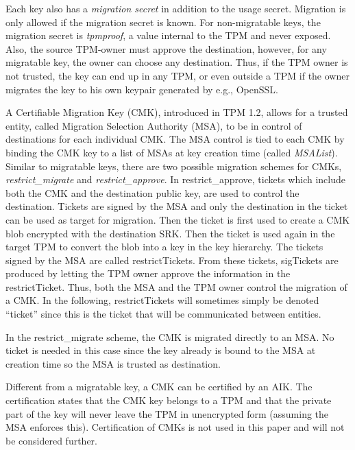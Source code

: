 {Each key also has a \textit{migration secret} in addition to the usage secret. Migration is only allowed if the migration secret is known. For non-migratable keys, the migration secret is \textit{tpmproof}, a value internal to the TPM and never exposed. Also, the source TPM-owner must approve the destination, however, for any migratable key, the owner can choose any destination. Thus, if the TPM owner is not trusted, the key can end up in any TPM, or even outside a TPM if the owner migrates the key to his own keypair generated by e.g., OpenSSL.

A Certifiable Migration Key (CMK), introduced in TPM 1.2, allows for a trusted entity, called Migration Selection Authority (MSA), to be in control of destinations for each individual CMK. The MSA control is tied to each CMK by binding the CMK key to a list of MSAs at key creation time (called \textit{MSAList}). Similar to migratable keys, there are two possible migration schemes for CMKs, \textit{restrict\_migrate} and \textit{restrict\_approve}. In restrict\_approve, tickets which include both the CMK and the destination public key, are used to control the destination. Tickets are signed by the MSA and only the destination in the ticket can be used as target for migration. Then the ticket is first used to create a CMK blob encrypted with the destination SRK. Then the ticket is used again in the target TPM to convert the blob into a key in the key hierarchy. The tickets signed by the MSA are called restrictTickets. From these tickets, sigTickets are produced by letting the TPM owner approve the information in the restrictTicket. Thus, both the MSA and the TPM owner control the migration of a CMK. In the following, restrictTickets will sometimes simply be denoted ``ticket'' since this is the ticket that will be communicated between entities.

In the restrict\_migrate scheme, the CMK is migrated directly to an MSA. No ticket is needed in this case since the key already is bound to the MSA at creation time so the MSA is trusted as destination.
 
Different from a migratable key, a CMK can be certified by an AIK. The certification states that the CMK key belongs to a TPM and that the private part of the key will never leave the TPM in unencrypted form (assuming the MSA enforces this). Certification of CMKs is not used in this paper and will not be considered further.
 
 
}
